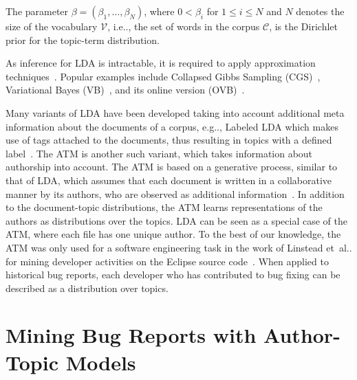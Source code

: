 \documentclass[a4paper,twoside]{article}
\makeatletter
\DeclareRobustCommand\onedot{\futurelet\@let@token\@onedot}
\def\@onedot{\ifx\@let@token.\else.\null\fi\xspace}
\def\etal{et~al\onedot}
\def\eg{e.g\onedot,\xspace}
\def\ie{i.e\onedot,\xspace}
\makeatother
\begin{document}
The parameter $\beta = (\beta_1, \dots, \beta_N)$, where $0 < \beta_i$ for $1\le i \le N$ and $N$ denotes the size of the vocabulary $\mathcal{V}$, \ie the set of words in the corpus $\mathcal{C}$, is the Dirichlet prior for the topic-term distribution.

As inference for \ac{LDA} is intractable, it is required to apply approximation techniques~\cite{blei2003latent}.
Popular examples include Collapsed Gibbs Sampling (CGS)~\cite{Griffiths2004FindingTopics}, Variational Bayes (VB)~\cite{blei2003latent}, and its online version (OVB)~\cite{Hoffman2010OnlineLDA}.

Many variants of \ac{LDA} have been developed taking into account additional meta information about the documents of a corpus, \eg Labeled LDA which makes use of tags attached to the documents, thus resulting in topics with a defined label~\cite{ramage2009labeled}.
The \ac{ATM} is another such variant, which takes information about authorship into account.
The \ac{ATM} is based on a generative process, similar to that of \ac{LDA}, which assumes that each document is written in a collaborative manner by its authors, who are observed as additional information~\cite{rosen-zvi2004authors}.
In addition to the document-topic distributions, the \ac{ATM} learns representations of the authors as distributions over the topics.
\ac{LDA} can be seen as a special case of the \ac{ATM}, where each file has one unique author.
To the best of our knowledge, the \ac{ATM} was only used for a software engineering task in the work of Linstead \etal for mining developer activities on the Eclipse source code~\cite{linstead2007eclipseeeveloper,Linstead2009Sourcerer:Repositories}.
When applied to historical bug reports, each developer who has contributed to bug fixing can be described as a distribution over topics.

\section{Mining Bug Reports with Author-Topic Models}
\label{section: atm}
\end{document}
